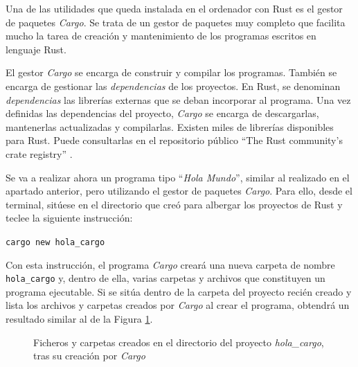 Una de las utilidades que queda instalada en el ordenador con Rust es el gestor de paquetes \textit{Cargo}. Se trata de un gestor de paquetes muy completo que facilita mucho la tarea de creación y mantenimiento de los programas escritos en lenguaje Rust.

El gestor \textit{Cargo} se encarga de construir y compilar los programas. También se encarga de gestionar las \textit{dependencias} de los proyectos. En Rust, se denominan \textit{dependencias} las librerías externas que se deban incorporar al programa. Una vez definidas las dependencias del proyecto, \textit{Cargo} se encarga de descargarlas,  mantenerlas actualizadas y compilarlas. Existen miles de librerías disponibles para Rust. Puede consultarlas en el repositorio público ``The Rust community’s crate registry'' \citep{communityofrustdevelopersRustCommunityCrate}.

Se va a realizar ahora un programa tipo ``\textit{Hola Mundo}'', similar al realizado en el apartado anterior, pero utilizando el gestor de paquetes \textit{Cargo}. Para ello, desde el terminal, sitúese en el directorio que creó para albergar los proyectos de Rust y teclee la siguiente instrucción:

{\centering\texttt{cargo new hola\_cargo}\par}

Con esta instrucción, el programa \textit{Cargo} creará una nueva carpeta de nombre \texttt{hola\_cargo} y, dentro de ella, varias carpetas y archivos que constituyen un programa ejecutable. Si se sitúa dentro de la carpeta del proyecto recién creado y lista los archivos y carpetas creados por \textit{Cargo} al crear el programa, obtendrá un resultado similar al de la Figura \ref{fig_holacargo}.

\begin{figure}[H]
   \begin{center}
      \setlength\fboxsep{2pt}
      \setlength\fboxrule{0.5pt}
      \caption{Ficheros y carpetas creados en el directorio del proyecto \textit{hola\_cargo}, tras su creación por \textit{Cargo}}
      \label{fig_holacargo}
   \end{center}
\end{figure}

